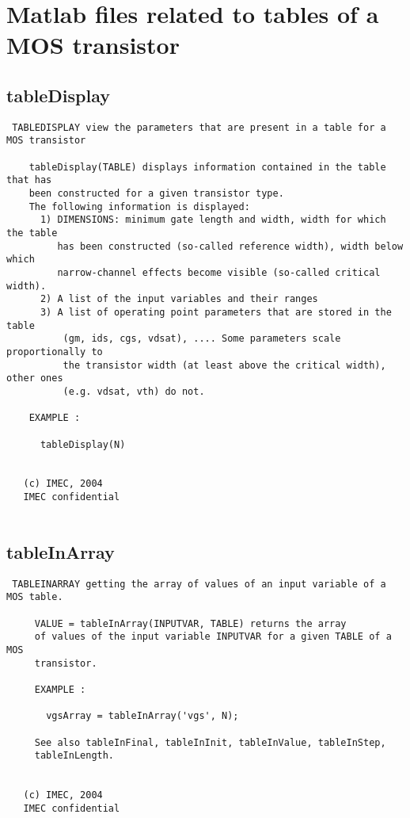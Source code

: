 \section{Matlab files related to tables of a MOS transistor}
\subsection{tableDisplay}
\label{sec:tableDisplay}
\begin{verbatim}
 TABLEDISPLAY view the parameters that are present in a table for a MOS transistor
 
    tableDisplay(TABLE) displays information contained in the table that has
    been constructed for a given transistor type.
    The following information is displayed:
      1) DIMENSIONS: minimum gate length and width, width for which the table
         has been constructed (so-called reference width), width below which
         narrow-channel effects become visible (so-called critical width).
      2) A list of the input variables and their ranges
      3) A list of operating point parameters that are stored in the table
          (gm, ids, cgs, vdsat), .... Some parameters scale proportionally to
          the transistor width (at least above the critical width), other ones 
          (e.g. vdsat, vth) do not.
 
    EXAMPLE :
 
      tableDisplay(N) 
 
 
   (c) IMEC, 2004
   IMEC confidential 
 

\end{verbatim}

\newpage
\subsection{tableInArray}
\label{sec:tableInArray}
\begin{verbatim}
 TABLEINARRAY getting the array of values of an input variable of a MOS table.
 
     VALUE = tableInArray(INPUTVAR, TABLE) returns the array
     of values of the input variable INPUTVAR for a given TABLE of a MOS
     transistor.
 
     EXAMPLE :
 
       vgsArray = tableInArray('vgs', N);
 
     See also tableInFinal, tableInInit, tableInValue, tableInStep,
     tableInLength.
 
 
   (c) IMEC, 2004
   IMEC confidential 
 

\end{verbatim}

